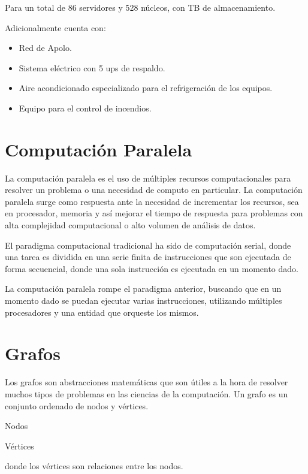 Para un total de  86 servidores y 528 núcleos, con  TB de almacenamiento. 

Adicionalmente cuenta con:

\begin{itemize}
 	\item Red de Apolo. 
 	\item Sistema eléctrico con 5 ups de respaldo.
 	\item Aire acondicionado especializado para el refrigeración de los equipos.
 	\item Equipo para el control de incendios.
 \end{itemize} 



\section{Computación Paralela}

La computación paralela es el uso de múltiples recursos computacionales para resolver un problema o una necesidad de computo en particular. La computación paralela surge como respuesta ante la necesidad de incrementar los recursos, sea en procesador, memoria y así mejorar el tiempo de respuesta para problemas con alta complejidad computacional o alto volumen de análisis de datos. 

El paradigma computacional tradicional ha sido de computación serial, donde una tarea es dividida en una serie finita de instrucciones que son ejecutada de forma secuencial, donde una sola instrucción es ejecutada en un momento dado. 

La computación paralela rompe el paradigma anterior, buscando que en un momento dado se puedan ejecutar varias instrucciones, utilizando múltiples procesadores y una entidad que orqueste los mismos.\cite{LLNL} \cite{SC}


\section{Grafos}

Los grafos son abstracciones matemáticas que son útiles a la hora de resolver muchos tipos de problemas en las ciencias de la computación. Un grafo es un conjunto ordenado de nodos y vértices. \cite{aho1983data} \cite{siek2001boost}

Nodos

Vértices

donde los vértices son relaciones entre los nodos. 

